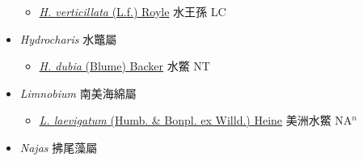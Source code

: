 \begin{itemize}
  \begin{itemize}
        \item[] \href{http://www.theplantlist.org/tpl1.1/search?q=Hydrilla+verticillata}{\textit{H. verticillata} (L.f.) Royle}   水王孫 LC
  \end{itemize}
 \item[] \textit{Hydrocharis} 水鼈屬
                    
  \begin{itemize}
        \item[] \href{http://www.theplantlist.org/tpl1.1/search?q=Hydrocharis+dubia}{\textit{H. dubia} (Blume) Backer}   水鱉 NT
  \end{itemize}
 \item[] \textit{Limnobium} 南美海綿屬
                    
  \begin{itemize}
        \item[] \href{http://www.theplantlist.org/tpl1.1/search?q=Limnobium+laevigatum}{\textit{L. laevigatum} (Humb. \& Bonpl. ex Willd.) Heine}   美洲水鱉 NA$^n$
  \end{itemize}
 \item[] \textit{Najas} 拂尾藻屬
                    

\end{itemize}
